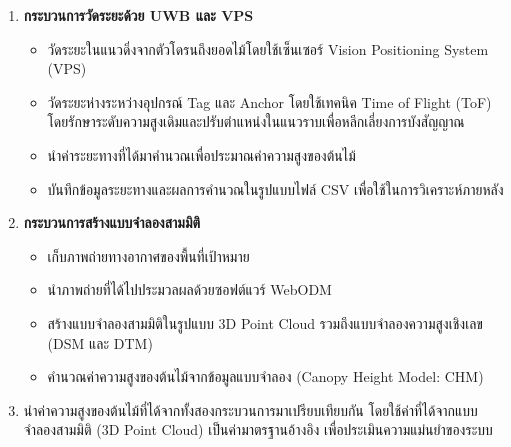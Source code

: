 \begin{enumerate}
    \item \textbf{กระบวนการวัดระยะด้วย UWB และ VPS}
    \begin{itemize}
        \item วัดระยะในแนวดิ่งจากตัวโดรนถึงยอดไม้โดยใช้เซ็นเซอร์ Vision Positioning System (VPS)
        \item วัดระยะห่างระหว่างอุปกรณ์ Tag และ Anchor โดยใช้เทคนิค Time of Flight (ToF) โดยรักษาระดับความสูงเดิมและปรับตำแหน่งในแนวราบเพื่อหลีกเลี่ยงการบังสัญญาณ
        \item นำค่าระยะทางที่ได้มาคำนวณเพื่อประมาณค่าความสูงของต้นไม้
        \item บันทึกข้อมูลระยะทางและผลการคำนวณในรูปแบบไฟล์ CSV เพื่อใช้ในการวิเคราะห์ภายหลัง
    \end{itemize}

    \item \textbf{กระบวนการสร้างแบบจำลองสามมิติ}
    \begin{itemize}
        \item เก็บภาพถ่ายทางอากาศของพื้นที่เป้าหมาย
        \item นำภาพถ่ายที่ได้ไปประมวลผลด้วยซอฟต์แวร์ WebODM
        \item สร้างแบบจำลองสามมิติในรูปแบบ 3D Point Cloud รวมถึงแบบจำลองความสูงเชิงเลข (DSM และ DTM)
        \item คำนวณค่าความสูงของต้นไม้จากข้อมูลแบบจำลอง (Canopy Height Model: CHM)
    \end{itemize}

    \item นำค่าความสูงของต้นไม้ที่ได้จากทั้งสองกระบวนการมาเปรียบเทียบกัน โดยใช้ค่าที่ได้จากแบบจำลองสามมิติ (3D Point Cloud) เป็นค่ามาตรฐานอ้างอิง เพื่อประเมินความแม่นยำของระบบ
\end{enumerate}

